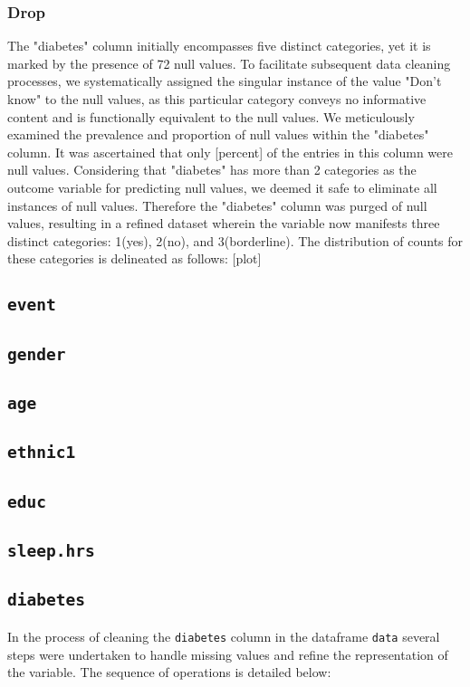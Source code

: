 \documentclass{article}
\begin{document}
\subsubsection*{Drop}
The "diabetes" column initially encompasses five distinct categories, yet it is marked by the presence of 72 null values. To facilitate subsequent data cleaning processes, we systematically assigned the singular instance of the value "Don't know" to the null values, as this particular category conveys no informative content and is functionally equivalent to the null values. We meticulously examined the prevalence and proportion of null values within the "diabetes" column. It was ascertained that only [percent] of the entries in this column were null values. Considering that "diabetes" has more than 2 categories as the outcome variable for predicting null values, we deemed it safe to eliminate all instances of null values. Therefore the "diabetes" column was purged of null values, resulting in a refined dataset wherein the variable now manifests three distinct categories: 1(yes), 2(no), and 3(borderline). The distribution of counts for these categories is delineated as follows: [plot]

\subsection*{\protect\Verb+event+}
\subsection*{\protect\Verb+gender+}
\subsection*{\protect\Verb+age+}
\subsection*{\protect\Verb+ethnic1+}
\subsection*{\protect\Verb+educ+}
\subsection*{\protect\Verb+sleep.hrs+}
\subsection*{\protect\Verb+diabetes+}
In the process of cleaning the 
\verb|diabetes| column in the dataframe \verb|data| several steps were undertaken to handle missing values and refine the representation of the variable. The sequence of operations is detailed below:
\end{document}
